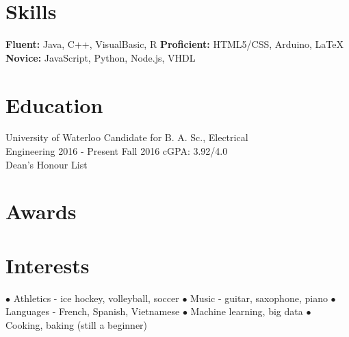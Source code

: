 \documentclass[]{aanguyen_cv}
\begin{document}
	\begin{sidebar}%
		\vspace{35pt}%
			\vspace{0.65cm}%
		\section{Skills}
			\textbf{Fluent: }Java, C++, VisualBasic, R
			\textbf{Proficient: }HTML5/CSS, Arduino, \LaTeX
			\textbf{Novice: }JavaScript, Python, Node.js, VHDL
			\vspace{0.65cm}%
		\section{Education}
			\eduentry%
				{University of Waterloo}%
				{Candidate for B. A. Sc., Electrical\\Engineering}%
				{2016 - Present}%
				{Fall 2016 cGPA: 3.92/4.0\\Dean's Honour List}
			\vspace{0.65cm}%
		\section{Awards}
			\vspace{0.65cm}%
		\section{Interests}
		$\bullet$ Athletics - ice hockey, volleyball, soccer
		$\bullet$ Music - guitar, saxophone, piano
		$\bullet$ Languages - French, Spanish, Vietnamese
		$\bullet$ Machine learning, big data
		$\bullet$ Cooking, baking (still a beginner)
	\end{sidebar}%
\end{document}
